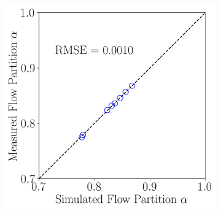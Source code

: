 \documentclass[preview, border=2pt]{standalone}
\begin{document}
\begin{figure}
\begin{subfigure}[b]{0.32\textwidth}
     \end{subfigure}
     \hfill     
     \begin{subfigure}[b]{0.32\textwidth}
         \centering
         \caption{}
         \includegraphics[width=\textwidth]{calibration_results_Cd_flow_partition.png}
     \end{subfigure}
\end{figure}
\end{document}
